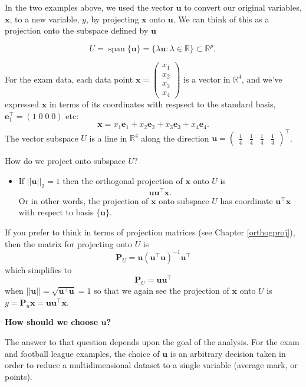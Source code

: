 \documentclass[
]{book}
\providecommand{\tightlist}{%
  \setlength{\itemsep}{0pt}\setlength{\parskip}{0pt}}
\theoremstyle{definition}
\theoremstyle{definition}
\theoremstyle{definition}
\theoremstyle{definition}
\theoremstyle{remark}
\begin{document}
In the two examples above, we used the vector \(\mathbf u\) to convert our original variables, \(\mathbf x\),
to a new variable, \(y\), by projecting \(\mathbf x\) onto \(\mathbf u\).
We can think of this as a projection onto the subspace defined by \(\mathbf u\)

\[U = \operatorname{span}\{\mathbf u\} = \{\lambda \mathbf u: \lambda \in \mathbb{R}\}\subset \mathbb{R}^p,\]

For the exam data, each data point \(\mathbf x= \begin{pmatrix} x_1 \\ x_2 \\ x_3 \\ x_4 \end{pmatrix}\)
is a vector in \(\mathbb{R}^4\), and we've expressed \(\mathbf x\) in terms of its coordinates with respsect to the standard basis, \(\mathbf e_1^\top = (1\; 0\; 0 \; 0)\) etc:
\[\mathbf x=x_1 \mathbf e_1 + x_2 \mathbf e_2 +x_3 \mathbf e_3 +x_4 \mathbf e_4.\]
The vector subspace \(U\) is a line in \(\mathbb{R}^4\) along the direction \(\mathbf u= \begin{pmatrix} \frac{1}{4} & \frac{1}{4} & \frac{1}{4} & \frac{1}{4} \end{pmatrix}^\top\).

How do we project onto subspace \(U\)?

\begin{itemize}
\tightlist
\item
  If \(||\mathbf u||_2=1\) then the orthogonal projection of \(\mathbf x\) onto \(U\) is\\
  \[\mathbf u\mathbf u^\top\mathbf x.\]
  Or in other words, the projection of \(\mathbf x\) onto subspace \(U\) has coordinate \(\mathbf u^\top \mathbf x\) with respect to basis \(\{\mathbf u\}\).
\end{itemize}

If you prefer to think in terms of projection matrices (see Chapter \ref{orthogproj}), then the matrix for projecting onto \(U\) is
\[\mathbf P_U = \mathbf u(\mathbf u^\top \mathbf u)^{-1}\mathbf u^\top\]
which simplifies to
\[\mathbf P_U = \mathbf u\mathbf u^\top\]
when \(||\mathbf u||=\sqrt{\mathbf u^\top\mathbf u}=1\) so that we again see the projection of \(\mathbf x\) onto \(U\) is \(y=\mathbf P_u \mathbf x= \mathbf u\mathbf u^\top\mathbf x\).

\textbf{How should we choose \(\mathbf u\)?}

The answer to that question depends upon the goal of the analysis. For the exam and football league examples, the choice of \(\mathbf u\) is an arbitrary decision taken in order to reduce a multidimensional dataset to a single variable (average mark, or points).
\end{document}
